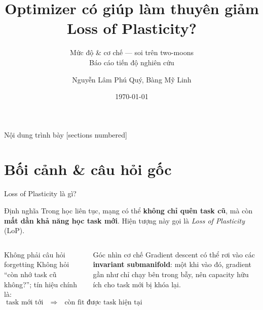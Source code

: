\documentclass[8pt,aspectratio=169]{beamer}
\title{Optimizer có giúp làm thuyên giảm\\Loss of Plasticity?}
\subtitle{Mức độ \& cơ chế --- soi trên two-moons\\Báo cáo tiến độ nghiên cứu}
\author{Nguyễn Lâm Phú Quý, Bàng Mỹ Linh}
\date{\today}
\newcommand{\hl}[1]{\textcolor{accent}{\textbf{#1}}}
\begin{document}
\begin{frame}[plain]
  \titlepage
\end{frame}

\begin{frame}{Nội dung trình bày}
  [sections numbered]
  \tableofcontents[hideallsubsections]
\end{frame}

\section{Bối cảnh \& câu hỏi gốc}

\begin{frame}{Loss of Plasticity là gì?}
\vspace{1.0em}
\begin{block}{Định nghĩa}
\large
Trong học liên tục, mạng có thể \textbf{không chỉ quên task cũ}, mà còn
\hl{mất dần khả năng học task mới}. Hiện tượng này gọi là
\textit{Loss of Plasticity} (LoP).
\end{block}

\vspace{1.0em}
\begin{columns}[T]
\begin{alertblock}{Không phải câu hỏi forgetting}
\small
Không hỏi ``còn nhớ task cũ không?''; tín hiệu chính là:
\[
\text{task mới tới} \quad \Rightarrow \quad
\text{còn fit được task hiện tại không?}
\]
\end{alertblock}

\begin{exampleblock}{Góc nhìn cơ chế}
\small
Gradient descent có thể rơi vào các \textbf{invariant submanifold}: một khi vào đó, gradient gần như chỉ chạy bên trong bẫy, nên capacity hữu ích cho task mới bị khóa lại.
\end{exampleblock}
\end{columns}
\end{frame}
\end{document}
